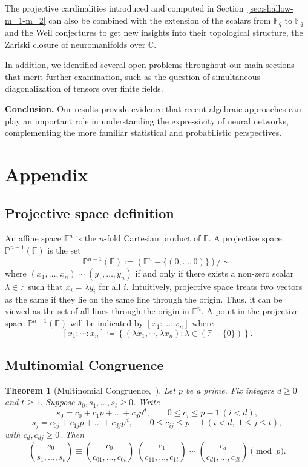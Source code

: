 \documentclass[a4paper]{cas-sc}
\newcommand{\F}{\mathbb{F}}
\newcommand{\C}{\mathbb{C}}     %
\renewcommand{\P}{\mathbb{P}}
\newtheorem{theorem}{Theorem}[section]
\begin{document}
    The projective cardinalities introduced and computed in Section~\ref{sec:shallow-m=1-m=2} can also be combined with the extension of the scalars from $\F_q$ to $\overline{\F}_q$ and the Weil conjectures to get new insights into their topological structure, the Zariski closure of neuromanifolds over $\C$.
    
    In addition, we identified several open problems throughout our main sections that merit further examination, such as the question of simultaneous diagonalization of tensors over finite fields.

    
    \textbf{Conclusion.} Our results provide evidence that recent algebraic approaches can play an important role in understanding the expressivity of neural networks, complementing the more familiar statistical and probabilistic perspectives.

\printcredits

 

\appendix
\section{Appendix}

\subsection{Projective space definition}
\label{apx: proj space def}

An affine space $\F^{n}$ is the $n$-fold Cartesian product of $\F$. A projective space $\P^{n-1}(\F)$ is the set 
    \[
        \P^{n-1}(\F) := (\F^{n}-\{(0,\dots,0)\})/\sim 
    \]
    where $(x_1,\dots,x_n)\sim(y_1,\dots,y_n)$ if and only if there exists a non-zero scalar $\lambda\in\F$ such that $x_i=\lambda y_i$ for all $i$. Intuitively, projective space treats two vectors as the same if they lie on the same line through the origin. Thus, it can be viewed as the set of all lines through the origin in $\F^{n}$. A point in the projective space $\P^{n-1}(\F)$ will be indicated by $[x_1:\dots:x_n]$ where
    \[
        [x_1 : \cdots : x_n]\coloneq\left\{(\lambda x_1 , \cdots , \lambda x_n) : \lambda \in (\F-\{0\})\right\}.   
    \]

\subsection{Multinomial Congruence}

\begin{theorem}[Multinomial Congruence,~\citep{CONRAD1995}]
\label{thm:lucas_multinomial}
    Let $p$ be a prime. Fix integers $d\ge 0$ and $t\ge 1$. Suppose $s_0,s_1,\dots ,s_t\ge 0$. Write
    \[
        s_0=c_0+c_1p+\dots +c_dp^{d},\qquad
        0\le c_i\le p-1\ (i<d),
    \]
    \[
        s_j=c_{0j}+c_{1j}p+\dots +c_{dj}p^{d},\qquad
        0\le c_{ij}\le p-1\ (i<d,\;1\le j\le t),
    \]
    with $c_d,c_{dj}\ge 0$. Then
    \[
        \binom{s_0}{s_1,\dots ,s_t}\equiv
        \binom{c_0}{c_{01},\dots ,c_{0t}}\;
        \binom{c_1}{c_{11},\dots ,c_{1t}}\;\cdots\;
        \binom{c_d}{c_{d1},\dots ,c_{dt}}
        \pmod p.
    \]
\end{theorem}
\end{document}
